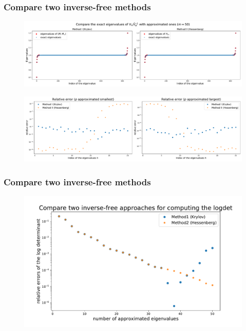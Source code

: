 \documentclass[dvipsnames,10pt]{beamer}
\begin{document}
\begin{frame}
    \frametitle{Compare two inverse-free methods}
\begin{figure}[H]
    \centering
    \includegraphics[scale = 0.23]{figs/Method_GEP_m_50.pdf}
\end{figure}
\begin{figure}[H]
    \centering
    \includegraphics[scale = 0.23]{figs/rel_err_m_50.pdf}
\end{figure}
\end{frame}
\begin{frame}
    \frametitle{Compare two inverse-free methods}
\begin{figure}[H]
    \centering
    \includegraphics[scale = 0.45]{figs/compare_two_inv_free_approaches.pdf}
\end{figure}
\end{frame}
\end{document}
